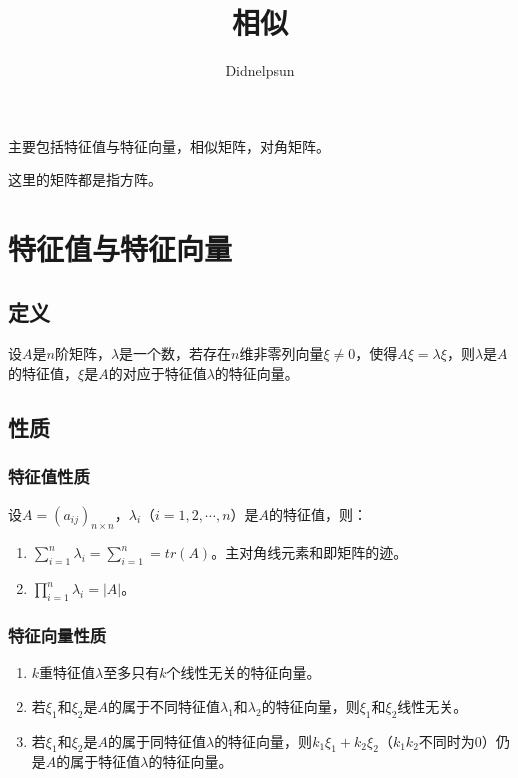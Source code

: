 \documentclass[UTF8, 12pt]{ctexart}
\author{Didnelpsun}
\title{相似}
\date{}
\begin{document}
\maketitle
\pagestyle{empty}
\thispagestyle{empty}
\tableofcontents
\thispagestyle{empty}
\newpage
\pagestyle{plain}
\setcounter{page}{1}

主要包括特征值与特征向量，相似矩阵，对角矩阵。

这里的矩阵都是指方阵。

\section{特征值与特征向量}

\subsection{定义}

设$A$是$n$阶矩阵，$\lambda$是一个数，若存在$n$维非零列向量$\xi\neq0$，使得$A\xi=\lambda\xi$，则$\lambda$是$A$的特征值，$\xi$是$A$的对应于特征值$\lambda$的特征向量。

\subsection{性质}

\subsubsection{特征值性质}

设$A=(a_{ij})_{n\times n}$，$\lambda_i$（$i=1,2,\cdots,n$）是$A$的特征值，则：

\begin{enumerate}
    \item $\sum\limits_{i=1}^n\lambda_i=\sum\limits_{i=1}^n=tr(A)$。主对角线元素和即矩阵的迹。
    \item $\prod\limits_{i=1}^n\lambda_i=\vert A\vert$。
\end{enumerate}

\subsubsection{特征向量性质}

\begin{enumerate}
    \item $k$重特征值$\lambda$至多只有$k$个线性无关的特征向量。
    \item 若$\xi_1$和$\xi_2$是$A$的属于不同特征值$\lambda_1$和$\lambda_2$的特征向量，则$\xi_1$和$\xi_2$线性无关。
    \item 若$\xi_1$和$\xi_2$是$A$的属于同特征值$\lambda$的特征向量，则$k_1\xi_1+k_2\xi_2$（$k_1k_2$不同时为0）仍是$A$的属于特征值$\lambda$的特征向量。
\end{enumerate}
\end{document}
